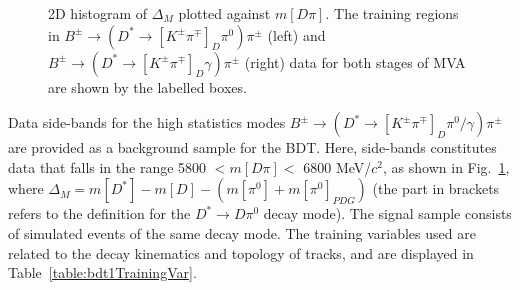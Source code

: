 \documentclass[oneside,12pt]{article}
\begin{document}
\begin{figure}[htp]
\centering
{}
\caption{{2D histogram of $\Delta_M$ plotted against $m[D\pi]$. The
training regions in $B^{\pm}\rightarrow (D^*\rightarrow
[K^{\pm}\pi^{\mp}]_D\pi^0)\pi^{\pm}$ (left) and $B^{\pm}\rightarrow
(D^*\rightarrow [K^{\pm}\pi^{\mp}]_D\gamma)\pi^{\pm}$ (right) data for both
stages of MVA are shown by the labelled boxes.}} \label{fig:trainingData}
\end{figure}

Data side-bands for the high statistics modes $B^{\pm}\rightarrow(D^{*}
\rightarrow [K^{\pm}\pi^{\mp}]_{D} \pi^0 /\gamma)\pi^{\pm}$ are provided as a
background sample for the BDT. Here, side-bands constitutes data that falls in
the range 5800 $ < m[D\pi] <$ 6800 MeV/$c^2$, as shown in
Fig.~\ref{fig:trainingData}, where $\Delta_M=m[D^{*}] - m[D]- (m[\pi^0] +
m[\pi^0]_{PDG})$ (the part in brackets refers to the definition for the
$D^*\rightarrow D\pi^0$ decay mode). The signal sample consists of simulated
events of the same decay mode. The training variables used are related to the
decay kinematics and topology of tracks, and are displayed in
Table~\ref{table:bdt1TrainingVar}. 
\end{document}
